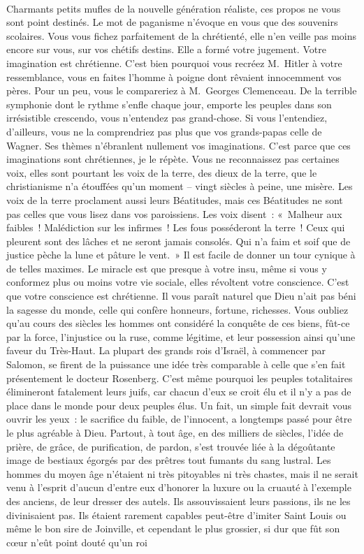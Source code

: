\documentclass[french,twoside]{book} %
\newcommand{\astertri}{\medskip\par\centerline{\color{rubric}\large\selectfont{\syms ✻\,✻\,✻}}\medskip\par}%
\begin{document}
\astertri

\noindent  \par
Charmants petits mufles de la nouvelle génération réaliste, ces propos ne vous sont point destinés. Le mot de paganisme n’évoque en vous que des souvenirs scolaires. Vous vous fichez parfaitement de la chrétienté, elle n’en veille pas moins encore sur vous, sur vos chétifs destins. Elle a formé votre jugement. Votre imagination est chrétienne. C’est bien pourquoi vous recréez M. Hitler à votre ressemblance, vous en faites l’homme à poigne dont rêvaient innocemment vos pères. Pour un peu, vous le compareriez à M. Georges Clemenceau. De la terrible symphonie dont le rythme s’enfle chaque jour, emporte les peuples dans son irrésistible crescendo, vous n’entendez pas grand-chose. Si vous l’entendiez, d’ailleurs, vous ne la comprendriez pas plus que vos grands-papas celle de Wagner. Ses thèmes n’ébranlent nullement vos imaginations. C’est parce que ces imaginations sont chrétiennes, je le répète. Vous ne reconnaissez pas certaines voix, elles sont pourtant les voix de la terre, des dieux de la terre, que le christianisme n’a étouffées qu’un moment – vingt siècles à peine, une misère. Les voix de la terre proclament aussi leurs Béatitudes, mais ces Béatitudes ne sont pas celles que vous lisez dans vos paroissiens. Les voix disent : « Malheur aux faibles ! Malédiction sur les infirmes ! Les fous posséderont la terre ! Ceux qui pleurent sont des lâches et ne seront jamais consolés. Qui n’a faim et soif que de justice pèche la lune et pâture le vent. » Il est facile de donner un tour cynique à de telles maximes. Le miracle est que presque à votre insu, même si vous y conformez plus ou moins votre vie sociale, elles révoltent votre conscience. C’est que votre conscience est chrétienne. Il vous paraît naturel que Dieu n’ait pas béni la sagesse du monde, celle qui confère honneurs, fortune, richesses. Vous oubliez qu’au cours des siècles les hommes ont considéré la conquête de ces biens, fût-ce par la force, l’injustice ou la ruse, comme légitime, et leur possession ainsi qu’une faveur du Très-Haut. La plupart des grands rois d’Israël, à commencer par Salomon, se firent de la puissance une idée très comparable à celle que s’en fait présentement le docteur Rosenberg. C’est même pourquoi les peuples totalitaires élimineront fatalement leurs juifs, car chacun d’eux se croit élu et il n’y a pas de place dans le monde pour deux peuples élus. Un fait, un simple fait devrait vous ouvrir les yeux : le sacrifice du faible, de l’innocent, a longtemps passé pour être le plus agréable à Dieu. Partout, à tout âge, en des milliers de siècles, l’idée de prière, de grâce, de purification, de pardon, s’est trouvée liée à la dégoûtante image de bestiaux égorgés par des prêtres tout fumants du sang lustral. Les hommes du moyen âge n’étaient ni très pitoyables ni très chastes, mais il ne serait venu à l’esprit d’aucun d’entre eux d’honorer la luxure ou la cruauté à l’exemple des anciens, de leur dresser des autels. Ils assouvissaient leurs passions, ils ne les divinisaient pas. Ils étaient rarement capables peut-être d’imiter Saint Louis ou même le bon sire de Joinville, et cependant le plus grossier, si dur que fût son cœur n’eût point douté qu’un roi 
\end{document}

